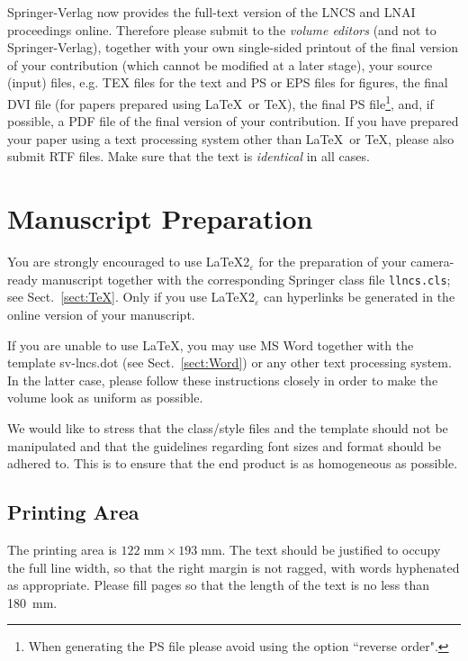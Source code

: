 \documentclass[a4paper]{llncs}
\begin{document}
Springer-Verlag now provides the full-text version of
the LNCS and LNAI proceedings online. Therefore please
submit to the {\it volume editors} (and not to Springer-Verlag),
together
with your own single-sided printout of the final version of your
contribution (which cannot be modified at a later stage), your source
(input) files, e.g. TEX files for the text
and PS or EPS files for figures, the final DVI file (for papers prepared
using \LaTeX\ or \TeX), the final
PS file\footnote{When generating the PS file please avoid using the
option ``reverse order".}, and, if possible, a PDF file of the final
version of your contribution.
If you have prepared your paper using a text processing system other
than \LaTeX\ or \TeX, please also submit RTF files.
Make sure that the text is {\em identical} in all cases.


\section{Manuscript Preparation}

You are strongly encouraged to use \LaTeX2$_\varepsilon$ for the
preparation of your
camera-ready manuscript together with the corresponding Springer
class file \verb+llncs.cls+;
see Sect.~\ref{sect:TeX}. Only if you use \LaTeX2$_\varepsilon$ can
hyperlinks be generated in the online version of your manuscript.

If you are unable to use \LaTeX, you may use MS Word together with the
template sv-lncs.dot (see Sect.~\ref{sect:Word}) or any other text
processing system. In the latter case, please follow
these instructions closely in order to make the volume
look as uniform as possible.

We would like to stress that the class/style files and the template
should not be manipulated and that the guidelines regarding font sizes
and format should be adhered to. This is to ensure that the end product
is as homogeneous as possible.


\subsection{Printing Area}
The printing area is $122  \; \mbox{mm} \times 193 \;
\mbox{mm}$.
The text should be justified to occupy the full line width,
so that the right margin is not ragged, with words hyphenated as
appropriate. Please fill pages so that the length of the text
is no less than 180~mm.
\end{document}
